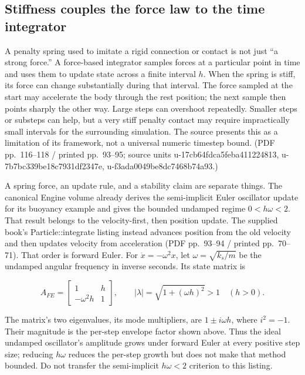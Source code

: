 \subsection{Stiffness couples the force law to the time integrator}\label{06-engine-ii-ch047-stiffness-couples-the-force-law-to-the-time-integrator}

A penalty spring used to imitate a rigid connection or contact is not just ``a strong force.'' A force-based integrator samples forces at a particular point in time and uses them to update state across a finite interval \(h\). When the spring is stiff, its force can change substantially during that interval. The force sampled at the start may accelerate the body through the rest position; the next sample then points sharply the other way. Large steps can overshoot repeatedly. Smaller steps or substeps can help, but a very stiff penalty contact may require impractically small intervals for the surrounding simulation. The source presents this as a limitation of its framework, not a universal numeric timestep bound. (PDF pp.~116--118 / printed pp.~93--95; source units u-17cb64fdca5feba411224813, u-7b7bc339be18c7931df2347e, u-f3ada0049be8dc7468b74a93.)

A spring force, an update rule, and a stability claim are separate things. The canonical Engine volume already derives the semi-implicit Euler oscillator update for its buoyancy example and gives the bounded undamped regime \(0<h\omega<2\). That result belongs to the velocity-first, then position update. The supplied book's Particle::integrate listing instead advances position from the old velocity and then updates velocity from acceleration (PDF pp.~93--94 / printed pp.~70--71). That order is forward Euler. For \(\ddot{x}=-\omega^2x\), let \(\omega=\sqrt{k_s/m}\) be the undamped angular frequency in inverse seconds. Its state matrix is

\[
A_{FE}=\begin{bmatrix}1&h\\-\omega^2h&1\end{bmatrix},
\qquad |\lambda|=\sqrt{1+(\omega h)^2}>1\quad(h>0).
\]

The matrix's two eigenvalues, its mode multipliers, are \(1\pm i\omega h\), where \(i^2=-1\). Their magnitude is the per-step envelope factor shown above. Thus the ideal undamped oscillator's amplitude grows under forward Euler at every positive step size; reducing \(h\omega\) reduces the per-step growth but does not make that method bounded. Do not transfer the semi-implicit \(h\omega<2\) criterion to this listing.

